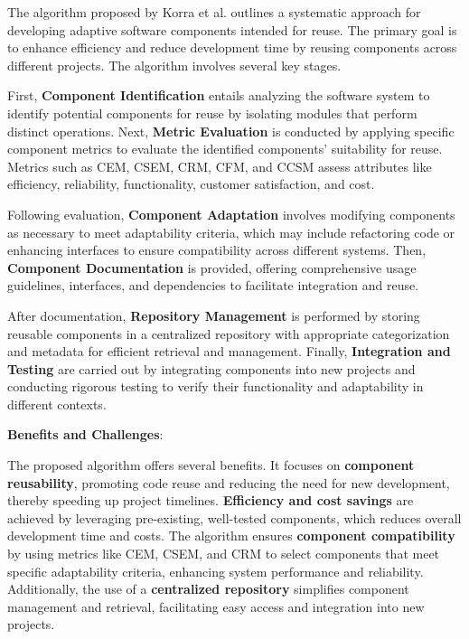 \documentclass[a4paper,10pt]{article}
\begin{document}
The algorithm proposed by Korra et al. \cite{Korra2022} outlines a systematic approach for developing adaptive software components intended for reuse. The primary goal is to enhance efficiency and reduce development time by reusing components across different projects. The algorithm involves several key stages. 

First, \textbf{Component Identification} entails analyzing the software system to identify potential components for reuse by isolating modules that perform distinct operations. Next, \textbf{Metric Evaluation} is conducted by applying specific component metrics to evaluate the identified components' suitability for reuse. Metrics such as CEM, CSEM, CRM, CFM, and CCSM assess attributes like efficiency, reliability, functionality, customer satisfaction, and cost.

Following evaluation, \textbf{Component Adaptation} involves modifying components as necessary to meet adaptability criteria, which may include refactoring code or enhancing interfaces to ensure compatibility across different systems. Then, \textbf{Component Documentation} is provided, offering comprehensive usage guidelines, interfaces, and dependencies to facilitate integration and reuse.

After documentation, \textbf{Repository Management} is performed by storing reusable components in a centralized repository with appropriate categorization and metadata for efficient retrieval and management. Finally, \textbf{Integration and Testing} are carried out by integrating components into new projects and conducting rigorous testing to verify their functionality and adaptability in different contexts.

\textbf{Benefits and Challenges}:

The proposed algorithm offers several benefits. It focuses on \textbf{component reusability}, promoting code reuse and reducing the need for new development, thereby speeding up project timelines. \textbf{Efficiency and cost savings} are achieved by leveraging pre-existing, well-tested components, which reduces overall development time and costs. The algorithm ensures \textbf{component compatibility} by using metrics like CEM, CSEM, and CRM to select components that meet specific adaptability criteria, enhancing system performance and reliability. Additionally, the use of a \textbf{centralized repository} simplifies component management and retrieval, facilitating easy access and integration into new projects.
\end{document}
